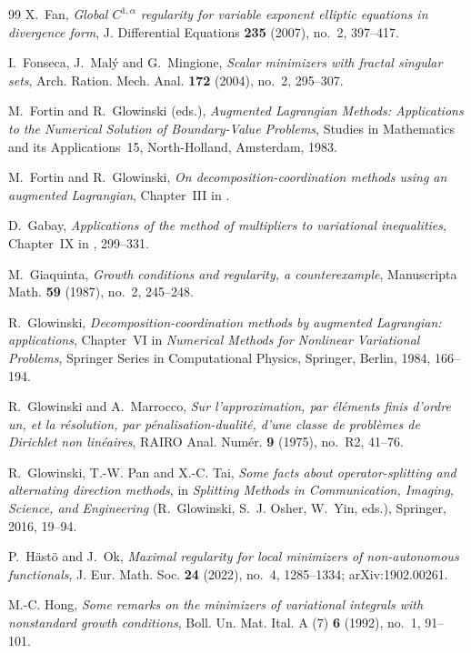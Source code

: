 \documentclass[11pt]{amsart}
\theoremstyle{definition}
\theoremstyle{remark}
\numberwithin{equation}{section}
\begin{document}
\begin{thebibliography}{99}
X.~Fan, \emph{Global $C^{1,\alpha}$ regularity for variable exponent elliptic equations in divergence form}, J. Differential Equations \textbf{235} (2007), no.~2, 397--417.

I.~Fonseca, J.~Mal\'y and G.~Mingione, \emph{Scalar minimizers with fractal singular sets}, Arch. Ration. Mech. Anal. \textbf{172} (2004), no.~2, 295--307.

M.~Fortin and R.~Glowinski (eds.), \emph{Augmented Lagrangian Methods: Applications to the Numerical Solution of Boundary-Value Problems}, Studies in Mathematics and its Applications~15, North-Holland, Amsterdam, 1983.

M.~Fortin and R.~Glowinski, \emph{On decomposition-coordination methods using an augmented Lagrangian}, Chapter~III in \cite{FortinGlowinski1983}.

D.~Gabay, \emph{Applications of the method of multipliers to variational inequalities}, Chapter~IX in \cite{FortinGlowinski1983}, 299--331.

M.~Giaquinta, \emph{Growth conditions and regularity, a counterexample}, Manuscripta Math. \textbf{59} (1987), no.~2, 245--248.

R.~Glowinski, \emph{Decomposition-coordination methods by augmented Lagrangian: applications}, Chapter~VI in \emph{Numerical Methods for Nonlinear Variational Problems}, Springer Series in Computational Physics, Springer, Berlin, 1984, 166--194.

R.~Glowinski and A.~Marrocco, \emph{Sur l'approximation, par \'el\'ements finis d'ordre un, et la r\'esolution, par p\'enalisation-dualit\'e, d'une classe de probl\`emes de Dirichlet non lin\'eaires}, RAIRO Anal. Num\'er. \textbf{9} (1975), no.~R2, 41--76.

R.~Glowinski, T.-W. Pan and X.-C. Tai, \emph{Some facts about operator-splitting and alternating direction methods}, in \emph{Splitting Methods in Communication, Imaging, Science, and Engineering} (R.~Glowinski, S.~J. Osher, W.~Yin, eds.), Springer, 2016, 19--94.

P.~H\"ast\"o and J.~Ok, \emph{Maximal regularity for local minimizers of non-autonomous functionals}, J. Eur. Math. Soc. \textbf{24} (2022), no.~4, 1285--1334; arXiv:1902.00261.

M.-C. Hong, \emph{Some remarks on the minimizers of variational integrals with nonstandard growth conditions}, Boll. Un. Mat. Ital. A (7) \textbf{6} (1992), no.~1, 91--101.


\end{thebibliography}
\end{document}
